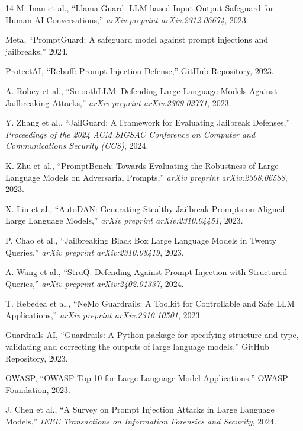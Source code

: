 \documentclass[conference]{IEEEtran}
\begin{document}
\begin{thebibliography}{14}
M. Inan et al., ``Llama Guard: LLM-based Input-Output Safeguard for Human-AI Conversations,'' \textit{arXiv preprint arXiv:2312.06674}, 2023.

Meta, ``PromptGuard: A safeguard model against prompt injections and jailbreaks,'' 2024.

ProtectAI, ``Rebuff: Prompt Injection Defense,'' GitHub Repository, 2023.

A. Robey et al., ``SmoothLLM: Defending Large Language Models Against Jailbreaking Attacks,'' \textit{arXiv preprint arXiv:2309.02771}, 2023.

Y. Zhang et al., ``JailGuard: A Framework for Evaluating Jailbreak Defenses,'' \textit{Proceedings of the 2024 ACM SIGSAC Conference on Computer and Communications Security (CCS)}, 2024.

K. Zhu et al., ``PromptBench: Towards Evaluating the Robustness of Large Language Models on Adversarial Prompts,'' \textit{arXiv preprint arXiv:2308.06588}, 2023.

X. Liu et al., ``AutoDAN: Generating Stealthy Jailbreak Prompts on Aligned Large Language Models,'' \textit{arXiv preprint arXiv:2310.04451}, 2023.

P. Chao et al., ``Jailbreaking Black Box Large Language Models in Twenty Queries,'' \textit{arXiv preprint arXiv:2310.08419}, 2023.

A. Wang et al., ``StruQ: Defending Against Prompt Injection with Structured Queries,'' \textit{arXiv preprint arXiv:2402.01337}, 2024.

T. Rebedea et al., ``NeMo Guardrails: A Toolkit for Controllable and Safe LLM Applications,'' \textit{arXiv preprint arXiv:2310.10501}, 2023.

Guardrails AI, ``Guardrails: A Python package for specifying structure and type, validating and correcting the outputs of large language models,'' GitHub Repository, 2023.

OWASP, ``OWASP Top 10 for Large Language Model Applications,'' OWASP Foundation, 2023.

J. Chen et al., ``A Survey on Prompt Injection Attacks in Large Language Models,'' \textit{IEEE Transactions on Information Forensics and Security}, 2024.
\end{thebibliography}
\end{document}
